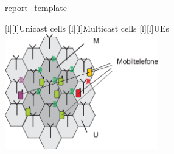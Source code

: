 \let \origdocument \document 
\let \EndPreamble \endinput 
\def \document {\endgroup \endinput }
 {report_template}
\usepackage [active,tightpage]{preview}
\let \document \origdocument 
\pagestyle {empty}

\centering \null \vfill 
\begin {preview}
 [l][l]{Unicast cells} [l][l]{Multicast cells} [l][l]{UEs} 
\includegraphics [width=0.5\textwidth ] {example2}
\end {preview}
\vfill 

